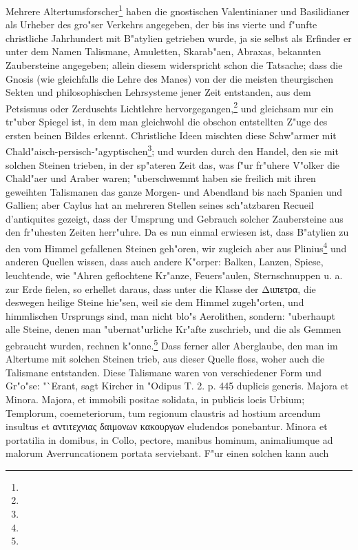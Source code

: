\documentclass[a4paper, 11pt, oneside, polutonikogreek, german]{article}
\begin{document}
Mehrere Altertumsforscher\footnote{} haben die gnostischen Valentinianer und Basilidianer als Urheber des gro"ser Verkehrs angegeben, der bis ins vierte und f"unfte christliche Jahrhundert mit B"atylien getrieben wurde, ja sie selbst als Erfinder er unter dem Namen Talismane, Amuletten, Skarab"aen, Abraxas, bekannten Zaubersteine angegeben; allein diesem widerspricht schon die Tatsache; dass die Gnosis (wie gleichfalls die Lehre des Manes) von der die meisten theurgischen Sekten und philosophischen Lehrsysteme jener Zeit entstanden, aus dem Petsismus oder Zerduschts Lichtlehre hervorgegangen,\footnote{} und gleichsam nur ein tr"uber Spiegel ist, in dem man gleichwohl die obschon entstellten Z"uge des ersten beinen Bildes erkennt. Christliche Ideen mischten diese Schw"armer mit Chald"aisch-persisch-"agyptischen\footnote{}; und wurden durch den Handel, den sie mit solchen Steinen trieben, in der sp"ateren Zeit das, was f"ur fr"uhere V"olker die Chald"aer und Araber waren; "uberschwemmt haben sie freilich mit ihren geweihten Talismanen das ganze Morgen- und Abendland bis nach Spanien und Gallien; aber Caylus hat an mehreren Stellen seines sch"atzbaren Recueil d'antiquites gezeigt, dass der Umsprung und Gebrauch solcher Zaubersteine aus den fr"uhesten Zeiten herr"uhre. Da es nun einmal erwiesen ist, dass B"atylien zu den vom Himmel gefallenen Steinen geh"oren, wir zugleich aber aus Plinius\footnote{} und anderen Quellen wissen, dass auch andere K"orper: Balken, Lanzen, Spiese, leuchtende, wie "Ahren geflochtene Kr"anze, Feuers"aulen, Sternschnuppen u. a. zur Erde fielen, so erhellet daraus, dass unter die Klasse der Διιπετρα, die deswegen heilige Steine hie"sen, weil sie dem Himmel zugeh"orten, und himmlischen Ursprungs sind, man nicht blo"s Aerolithen, sondern: "uberhaupt alle Steine, denen man "ubernat"urliche Kr"afte zuschrieb, und die als Gemmen gebraucht wurden, rechnen k"onne.\footnote{} Dass ferner aller Aberglaube, den man im Altertume mit solchen Steinen trieb, aus dieser Quelle floss, woher auch die Talismane entstanden. Diese Talismane waren von verschiedener Form und Gr"o"se: "`Erant, sagt Kircher in "Odipus T. 2. p. 445 duplicis generis. Majora et Minora. Majora, et immobili positae solidata, in publicis locis Urbium; Templorum, coemeteriorum, tum regionum claustris ad hostium arcendum insultus et αντιτεχνιας δαιμονων κακουργων eludendos ponebantur. Minora et portatilia in domibus, in Collo, pectore, manibus hominum, animaliumque ad malorum Averruncationem portata serviebant. F"ur einen solchen kann auch 
\end{document}
